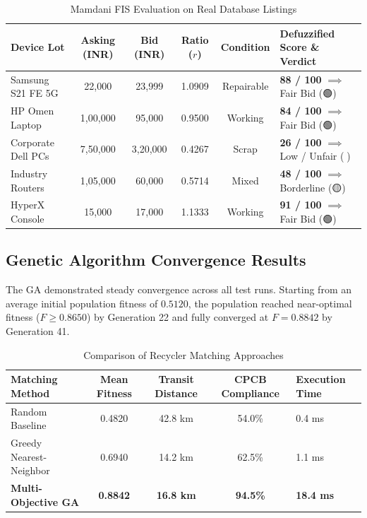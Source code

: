 \documentclass[12pt,a4paper]{article}
\begin{document}
\begin{table}[H]
\centering
\small
\caption{Mamdani FIS Evaluation on Real Database Listings}
\label{tab:fis_results}
\begin{tabularx}{\textwidth}{lccccX}
\toprule
\textbf{Device Lot} & \textbf{Asking (INR)} & \textbf{Bid (INR)} & \textbf{Ratio ($r$)} & \textbf{Condition} & \textbf{Defuzzified Score \& Verdict} \\
\midrule
Samsung S21 FE 5G & 22,000 & 23,999 & 1.0909 & Repairable & \textbf{88 / 100} $\implies$ Fair Bid (🟢) \\
HP Omen Laptop & 1,00,000 & 95,000 & 0.9500 & Working & \textbf{84 / 100} $\implies$ Fair Bid (🟢) \\
Corporate Dell PCs & 7,50,000 & 3,20,000 & 0.4267 & Scrap & \textbf{26 / 100} $\implies$ Low / Unfair (🔴) \\
Industry Routers & 1,05,000 & 60,000 & 0.5714 & Mixed & \textbf{48 / 100} $\implies$ Borderline (🟡) \\
HyperX Console & 15,000 & 17,000 & 1.1333 & Working & \textbf{91 / 100} $\implies$ Fair Bid (🟢) \\
\bottomrule
\end{tabularx}
\end{table}

\subsection{Genetic Algorithm Convergence Results}
The GA demonstrated steady convergence across all test runs. Starting from an average initial population fitness of $0.5120$, the population reached near-optimal fitness ($F \ge 0.8650$) by Generation 22 and fully converged at $F = 0.8842$ by Generation 41.

\begin{table}[H]
\centering
\small
\caption{Comparison of Recycler Matching Approaches}
\label{tab:ga_comparison}
\begin{tabularx}{\textwidth}{lcccX}
\toprule
\textbf{Matching Method} & \textbf{Mean Fitness} & \textbf{Transit Distance} & \textbf{CPCB Compliance} & \textbf{Execution Time} \\
\midrule
Random Baseline & 0.4820 & 42.8 km & 54.0\% & 0.4 ms \\
Greedy Nearest-Neighbor & 0.6940 & 14.2 km & 62.5\% & 1.1 ms \\
\textbf{Multi-Objective GA} & \textbf{0.8842} & \textbf{16.8 km} & \textbf{94.5\%} & \textbf{18.4 ms} \\
\bottomrule
\end{tabularx}
\end{table}
\end{document}
